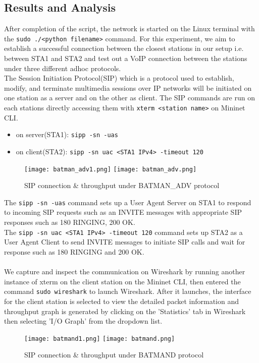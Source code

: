 \documentclass{article}
\begin{document}
\subsection{Results and Analysis}
After completion of the script, the network is started on the Linux terminal with the \texttt{sudo ./<python filename>} command. For this experiment, we aim to establish a successful connection between the closest stations in our setup i.e. between STA1 and STA2 and test out a VoIP connection between the stations under three different adhoc protocols. \\ The Session Initiation Protocol(SIP) which is a protocol used to establish, modify, and terminate multimedia sessions over IP networks will be initiated on one station as a server and on the other as client. The SIP commands are run on each stations directly accessing them with \texttt{xterm <station name>} on Mininet CLI. 
	\begin{itemize}
		\item on server(STA1): \texttt{sipp -sn -uas}
		\item on client(STA2): \texttt{sipp -sn uac <STA1 IPv4> -timeout 120}
	\end{itemize}
	\begin{figure}[h]
        		\centering
        		\texttt{[image: batman\_adv1.png]}
        		\texttt{[image: batman\_adv.png]}		
        		\caption{SIP connection \& throughput under BATMAN\_ADV protocol}
        		\label{fig:t2-2}
    	\end{figure}
The \texttt{sipp -sn -uas} command sets up a User Agent Server on STA1 to respond to incoming SIP requests such as an INVITE messages with appropriate SIP responses such as 180 RINGING, 200 OK. \\ The \texttt{sipp -sn uac <STA1 IPv4> -timeout 120} command sets up STA2 as a User Agent Client to send INVITE messages to initiate SIP calls and wait for response  such as 180 RINGING and 200 OK. \\\\ We capture and inspect the communication on Wireshark by running another instance of xterm on the client station on the Mininet CLI, then entered the command \texttt{sudo wireshark} to launch Wireshark. After it launches, the interface for the client station is selected to view the detailed packet information and throughput graph is generated by clicking on the 'Statistics' tab in Wireshark then selecting 'I/O Graph' from the dropdown list.
    	\begin{figure}[h]
        		\centering
        		\texttt{[image: batmand1.png]}
		\texttt{[image: batmand.png]}
        		\caption{SIP connection \& throughput under BATMAND protocol}
        		\label{fig:t2-3}
    	\end{figure}
\end{document}
